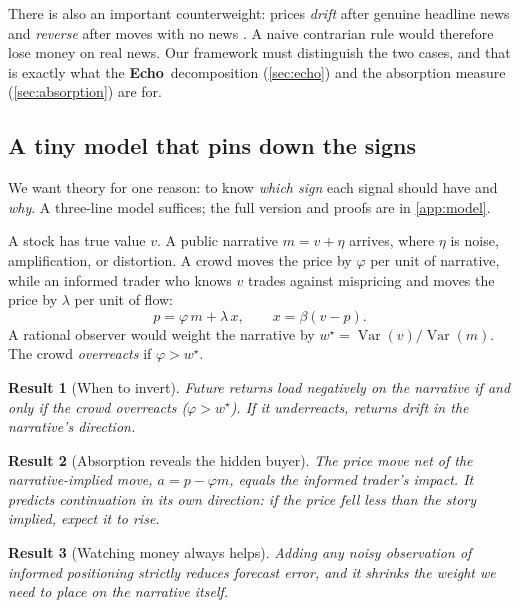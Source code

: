 \documentclass[11pt,a4paper]{article}
\theoremstyle{plain}
\newtheorem{proposition}{Result}
\theoremstyle{definition}
\DeclareMathOperator{\Var}{Var}
\newcommand{\ECHO}{\textcolor{echo}{\textbf{Echo}}}
\begin{document}
There is also an important counterweight: prices \emph{drift} after genuine headline news and \emph{reverse} after moves with no news \citep{chan2003}. A naive contrarian rule would therefore lose money on real news. Our framework must distinguish the two cases, and that is exactly what the \ECHO\ decomposition (\cref{sec:echo}) and the absorption measure (\cref{sec:absorption}) are for.

\subsection{A tiny model that pins down the signs}

We want theory for one reason: to know \emph{which sign} each signal should have and \emph{why}. A three-line model suffices; the full version and proofs are in \cref{app:model}.

A stock has true value $v$. A public narrative $m = v + \eta$ arrives, where $\eta$ is noise, amplification, or distortion. A crowd moves the price by $\varphi$ per unit of narrative, while an informed trader who knows $v$ trades against mispricing and moves the price by $\lambda$ per unit of flow:
\begin{equation}
  p = \varphi\, m + \lambda\, x, \qquad x = \beta(v - p).
\end{equation}
A rational observer would weight the narrative by $w^\star = \Var(v)/\Var(m)$. The crowd \emph{overreacts} if $\varphi > w^\star$.

\begin{proposition}[When to invert]\label{res:invert}
Future returns load \emph{negatively} on the narrative if and only if the crowd overreacts ($\varphi > w^\star$). If it underreacts, returns drift in the narrative's direction.
\end{proposition}

\begin{proposition}[Absorption reveals the hidden buyer]\label{res:absorb}
The price move \emph{net of} the narrative-implied move, $a = p - \varphi m$, equals the informed trader's impact. It predicts continuation in its own direction: if the price fell less than the story implied, expect it to rise.
\end{proposition}

\begin{proposition}[Watching money always helps]\label{res:money}
Adding any noisy observation of informed positioning strictly reduces forecast error, and it shrinks the weight we need to place on the narrative itself.
\end{proposition}
\end{document}
